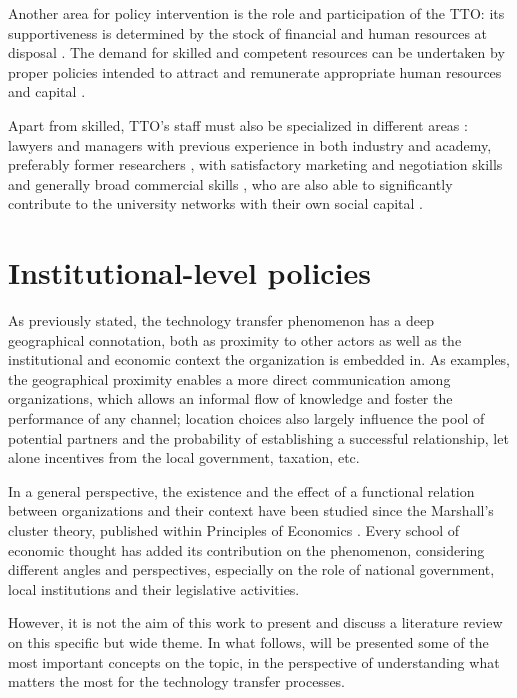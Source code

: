 Another area for policy intervention is the role and participation of the TTO: its supportiveness is determined by the stock of financial and human resources at disposal \citep{Siegel2007}. The demand for skilled and competent resources can be undertaken by proper policies intended to attract and remunerate appropriate human resources and capital \citep{Rasmussen2006}.

Apart from skilled, TTO's staff must also be specialized in different areas \citep{Guerrero2014}: lawyers and managers with previous experience in both industry and academy, preferably former researchers \citep{Debackere2005}, with satisfactory marketing and negotiation skills \citep{Siegel2003a} and generally broad commercial skills \citep{Siegel2007}, who are also able to significantly contribute to the university networks with their own social capital \citep{Geuna2009}.

\section{Institutional-level policies}

As previously stated, the technology transfer phenomenon has a deep geographical connotation, both as proximity to other actors as well as the institutional and economic context the organization is embedded in. As examples, the geographical proximity enables a more direct communication among organizations, which allows an informal flow of knowledge and foster the performance of any channel; location choices also largely influence the pool of potential partners and the probability of establishing a successful relationship, let alone incentives from the local government, taxation, etc.

In a general perspective, the existence and the effect of a functional relation between organizations and their context have been studied since the Marshall's cluster theory, published within Principles of Economics \citep{Marshall1890}. Every school of economic thought has added its contribution on the phenomenon, considering different angles and perspectives, especially on the role of national government, local institutions and their legislative activities.

However, it is not the aim of this work to present and discuss a literature review on this specific but wide theme. In what follows, will be presented some of the most important concepts on the topic, in the perspective of understanding what matters the most for the technology transfer processes.

